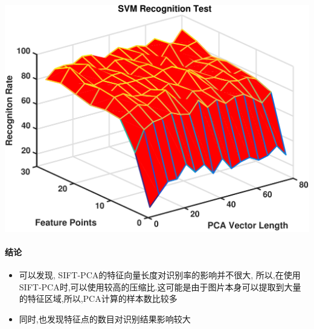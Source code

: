 		\begin{center}
		\begin{minipage}[t]{\linewidth}
		\center
		{
		\includegraphics[width=\textwidth]{Img/c3/sift_pca_iter} 
		}
		\end{minipage}
		\medskip
		\end{center}

\paragraph{结论}

\begin{itemize}
	\item 可以发现, SIFT-PCA的特征向量长度对识别率的影响并不很大, 所以,在使用SIFT-PCA时,可以使用较高的压缩比.这可能是由于图片本身可以提取到大量的特征区域,所以,PCA计算的样本数比较多
	\item 同时,也发现特征点的数目对识别结果影响较大
\end{itemize}

